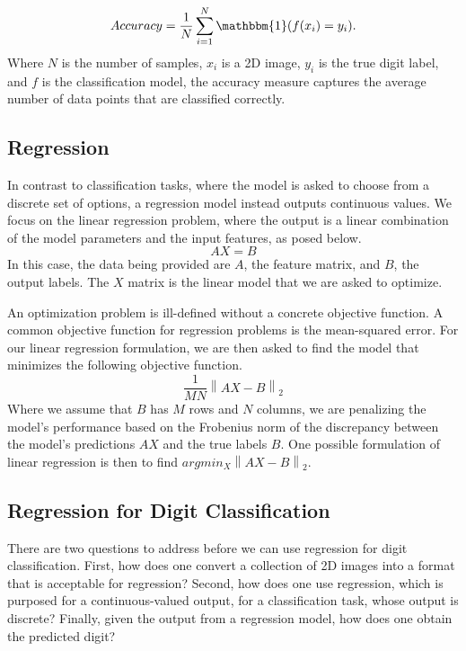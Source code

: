 \documentclass[letterpaper, 10 pt, conference]{ieeeconf}  %
\newcommand{\norm}[1]{\left\lVert#1\right\rVert}
\begin{document}
\begin{equation}
Accuracy =  \frac{1}{N} \sum_{i=1}^{N} \mathbbm{1}(f(x_i) = y_i).
\label{eq:accuracy}
\end{equation}
Where $N$ is the number of samples, $x_i$ is a 2D image, $y_i$ is the true digit label, and $f$ is the classification model, the accuracy measure captures the average number of data points that are classified correctly.

\subsection{Regression}
In contrast to classification tasks, where the model is asked to choose from a discrete set of options, a regression model instead outputs continuous values. We focus on the linear regression problem, where the output is a linear combination of the model parameters and the input features, as posed below.
\begin{equation}
AX = B \label{eq:regression}
\end{equation}
In this case, the data being provided are $A$, the feature matrix, and $B$, the output labels. The $X$ matrix is the linear model that we are asked to optimize.

An optimization problem is ill-defined without a concrete objective function. A common objective function for regression problems is the mean-squared error. For our linear regression formulation, we are then asked to find the model that minimizes the following objective function.
\begin{equation}
    \frac{1}{MN}\norm{AX - B}_2 \label{eq:mse}
\end{equation}
Where we assume that $B$ has $M$ rows and $N$ columns, we are penalizing the model's performance based on the Frobenius norm of the discrepancy between the model's predictions $AX$ and the true labels $B$. One possible formulation of linear regression is then to find $argmin_X \norm{AX - B}_2$.

\subsection{Regression for Digit Classification}
\label{section:regression_for_classification}
There are two questions to address before we can use regression for digit classification. First, how does one convert a collection of 2D images into a format that is acceptable for regression? Second, how does one use regression, which is purposed for a continuous-valued output, for a classification task, whose output is discrete? Finally, given the output from a regression model, how does one obtain the predicted digit?
\end{document}
